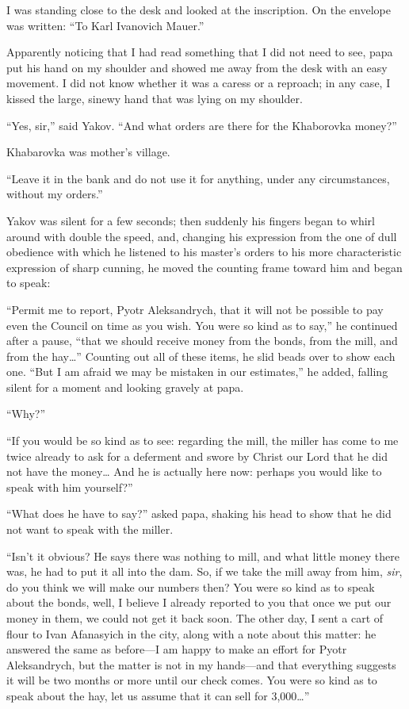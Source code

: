 I was standing close to the desk and looked at the inscription. On the envelope was written: ``To Karl Ivanovich Mauer.''

Apparently noticing that I had read something that I did not need to see, papa put his hand on my shoulder and showed me away from the desk with an easy movement. I did not know whether it was a caress or a reproach; in any case, I kissed the large, sinewy hand that was lying on my shoulder.

``Yes, sir,'' said Yakov. ``And what orders are there for the Khaborovka money?'' %

Khabarovka was mother's village.

``Leave it in the bank and do not use it for anything, under any circumstances, without my orders.'' %

Yakov was silent for a few seconds; then suddenly his fingers began to whirl around with double the speed, and, changing his expression from the one of dull obedience with which he listened to his master's orders to his more characteristic expression of sharp cunning, he moved the counting frame toward him and began to speak:

``Permit me to report, Pyotr Aleksandrych, that it will not be possible to pay even the Council on time as you wish. You were so kind as to say,'' he continued after a pause, ``that we should receive money from the bonds, from the mill, and from the hay\ldots{}'' Counting out all of these items, he slid beads over to show each one. ``But I am afraid we may be mistaken in our estimates,'' he added, falling silent for a moment and looking gravely at papa. %

``Why?'' %

``If you would be so kind as to see: regarding the mill, the miller has come to me twice already to ask for a deferment and swore by Christ our Lord that he did not have the money\ldots{} And he is actually here now: perhaps you would like to speak with him yourself?'' %

``What does he have to say?'' asked papa, shaking his head to show that he did not want to speak with the miller. %

``Isn't it obvious? He says there was nothing to mill, and what little money there was, he had to put it all into the dam. So, if we take the mill away from him, \emph{sir}, do you think we will make our numbers then? You were so kind as to speak about the bonds, well, I believe I already reported to you that once we put our money in them, we could not get it back soon. The other day, I sent a cart of flour to Ivan Afanasyich in the city, along with a note about this matter: he answered the same as before---I am happy to make an effort for Pyotr Aleksandrych, but the matter is not in my hands---and that everything suggests it will be two months or more until our check comes. You were so kind as to speak about the hay, let us assume that it can sell for 3,000\ldots{}'' %

